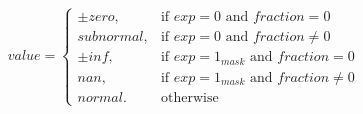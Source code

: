 \begin{equation*}
value =
\begin{cases}
    \pm zero,  & \text{if $exp = 0$        and $fraction = 0$} \\
    subnormal, & \text{if $exp = 0$        and $fraction \neq 0$} \\
    \pm inf,   & \text{if $exp = 1_{mask}$ and $fraction = 0$} \\
    nan,       & \text{if $exp = 1_{mask}$ and $fraction \neq 0$} \\
    normal.    & \text{otherwise}
\end{cases}
\label{eq:float32_algorithm}
\end{equation*}
